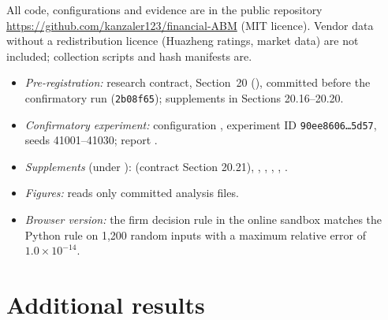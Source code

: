 \documentclass[11pt]{article}
\begin{document}
All code, configurations and evidence are in the public repository \url{https://github.com/kanzaler123/financial-ABM} (MIT licence). Vendor data without a redistribution licence (Huazheng ratings, market data) are not included; collection scripts and hash manifests are.

\begin{itemize}[leftmargin=*]
\item \emph{Pre-registration:} research contract, Section~20 (), committed before the confirmatory run (\texttt{2b08f65}); supplements in Sections 20.16--20.20.
\item \emph{Confirmatory experiment:} configuration , experiment ID \texttt{90ee8606\ldots5d57}, seeds 41001--41030; report .
\item \emph{Supplements} (under ):  (contract Section 20.21), , , , , .
\item \emph{Figures:}  reads only committed analysis files.
\item \emph{Browser version:} the firm decision rule in the online sandbox matches the Python rule on 1,200 random inputs with a maximum relative error of $1.0\times10^{-14}$.
\end{itemize}

\section{Additional results}\label{app:extra}
\end{document}
